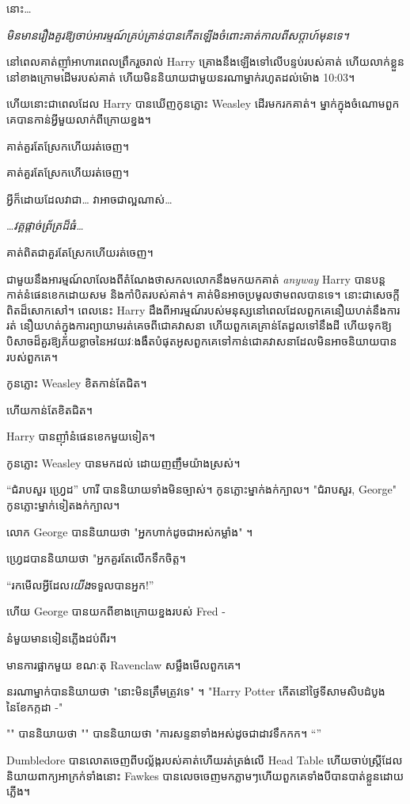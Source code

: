 {{{នោះ…

\emph{មិនមានរឿងគួរឱ្យចាប់អារម្មណ៍គ្រប់គ្រាន់បានកើតឡើងចំពោះគាត់កាលពីសប្តាហ៍មុនទេ។}

នៅពេលគាត់ញ៉ាំអាហារពេលព្រឹករួចរាល់ Harry គ្រោងនឹងឡើងទៅលើបន្ទប់របស់គាត់ ហើយលាក់ខ្លួននៅខាងក្រោមដើមរបស់គាត់ ហើយមិននិយាយជាមួយនរណាម្នាក់រហូតដល់ម៉ោង 10:03\am។

ហើយនោះជាពេលដែល Harry បានឃើញកូនភ្លោះ Weasley ដើរមករកគាត់។ ម្នាក់​ក្នុង​ចំណោម​ពួក​គេ​បាន​កាន់​អ្វី​មួយ​លាក់​ពី​ក្រោយ​ខ្នង។

គាត់គួរតែស្រែកហើយរត់ចេញ។

គាត់គួរតែស្រែកហើយរត់ចេញ។

អ្វី​ក៏ដោយ​ដែល​វា​ជា​… វា​អាច​ជា​ល្អ​ណាស់​…

…\emph{វគ្គផ្តាច់ព្រ័ត្រដ៏ធំ…}

គាត់​ពិត​ជា​គួរ​តែ​ស្រែក​ហើយ​រត់​ចេញ។

ជាមួយនឹងអារម្មណ៍លាលែងពីតំណែងថាសកលលោកនឹងមកយកគាត់ \emph{anyway} Harry បានបន្តកាត់នំផេនខេកដោយសម និងកាំបិតរបស់គាត់។ គាត់មិនអាចប្រមូលថាមពលបានទេ។ នោះជាសេចក្តីពិតដ៏សោកសៅ។ ពេលនេះ Harry ដឹងពីអារម្មណ៍របស់មនុស្សនៅពេលដែលពួកគេនឿយហត់នឹងការរត់ នឿយហត់ក្នុងការព្យាយាមរត់គេចពីជោគវាសនា ហើយពួកគេគ្រាន់តែដួលទៅនឹងដី ហើយទុកឱ្យបិសាចដ៏គួរឱ្យភ័យខ្លាចនៃអវយវៈងងឹតបំផុតអូសពួកគេទៅកាន់ជោគវាសនាដែលមិនអាចនិយាយបានរបស់ពួកគេ។

កូនភ្លោះ Weasley ខិតកាន់តែជិត។

ហើយកាន់តែខិតជិត។

Harry បានញ៉ាំនំផេនខេកមួយទៀត។

កូនភ្លោះ Weasley បានមកដល់ ដោយញញឹមយ៉ាងស្រស់។

“ជំរាបសួរ ហ្វ្រេដ” ហារី បាននិយាយទាំងមិនច្បាស់។ កូនភ្លោះម្នាក់ងក់ក្បាល។ "ជំរាបសួរ, George" កូនភ្លោះម្នាក់ទៀតងក់ក្បាល។

លោក George បាននិយាយថា "អ្នកហាក់ដូចជាអស់កម្លាំង" ។

ហ្វ្រេដបាននិយាយថា "អ្នកគួរតែលើកទឹកចិត្ត។

“រកមើលអ្វីដែល\emph{យើង}ទទួលបានអ្នក!”

ហើយ George បានយកពីខាងក្រោយខ្នងរបស់ Fred -

នំ​មួយ​មាន​ទៀន​ភ្លើង​ដប់ពីរ។

មានការផ្អាកមួយ ខណៈតុ Ravenclaw សម្លឹងមើលពួកគេ។

នរណាម្នាក់បាននិយាយថា "នោះមិនត្រឹមត្រូវទេ" ។ "Harry Potter កើតនៅថ្ងៃទីសាមសិបដំបូងនៃខែកក្កដា -"

"" បាននិយាយថា "" បាននិយាយថា "ការសន្ទនាទាំងអស់ដូចជាដាវទឹកកក។ “”

Dumbledore បានលោតចេញពីបល្ល័ង្ករបស់គាត់ហើយរត់ត្រង់លើ Head Table ហើយចាប់ស្ត្រីដែលនិយាយពាក្យអាក្រក់ទាំងនោះ Fawkes បានលេចចេញមកភ្លាមៗហើយពួកគេទាំងបីបានបាត់ខ្លួនដោយភ្លើង។

}}}
